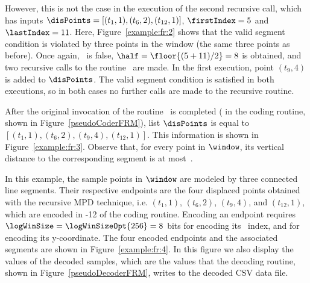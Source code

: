 \clearpage




However, this is not the case in the execution of the second recursive call, which has inputs $\disPoints=[(t_1,1), (t_{6},2), (t_{12},1)]$, $\firstIndex = 5$ and $\lastIndex = 11$. Here, Figure~\ref{example:fr:2} shows that the valid segment condition is violated by three points in the window (the same three points as before). Once again, \validSegment\ is false, $\half=\floor{(5 + 11) / 2}=8$ is obtained, and two recursive calls to the routine \getDisplacedPointsMethod\ are made. In the first execution, point $(t_9,4)$ is added to $\disPoints$. The valid segment condition is satisfied in both executions, so in both cases no further calls are made to the recursive routine. 


After the original invocation of the routine \getDisplacedPointsMethod\ is completed ( in the coding routine, shown in Figure~\ref{pseudoCoderFRM}), list $\disPoints$ is equal to $[(t_1,1), (t_{6},2), (t_9,4), (t_{12},1)]$. This information is shown in Figure~\ref{example:fr:3}. Observe that, for every point in $\window$, its vertical distance to the corresponding segment is at most~\maxerror.


\vspace{+5pt}


\clearpage


In this example, the sample points in $\window$ are modeled by three connected line segments. Their respective endpoints are the four displaced points obtained with the recursive MPD technique, i.e. $(t_1,1)$, $(t_6,2)$, $(t_9,4)$, and $(t_{12},1)$, which are encoded in -12 of the coding routine. Encoding an endpoint requires $\logWinSize = \logWinSizeOpt{256}=8$ bits for encoding its \window\ index, and \tobitexp for encoding its y-coordinate. The four encoded endpoints and the associated segments are shown in Figure~\ref{example:fr:4}. In this figure we also display the values of the decoded samples, which are the values that the decoding routine, shown in Figure~\ref{pseudoDecoderFRM}, writes to the decoded CSV data file. 


\vspace{+5pt}

